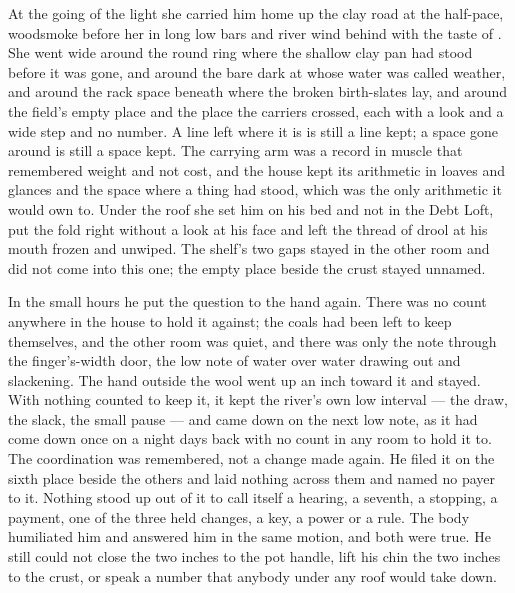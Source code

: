 \scenebreak

At the going of the light she carried him home up the clay road at the half-pace, woodsmoke before her in long low bars and river wind behind with the taste of . She went wide around the round ring where the shallow clay pan had stood before it was gone, and around the bare dark  at  whose water was called weather, and around the rack space beneath  where the broken birth-slates lay, and around the field's empty place and the place the carriers crossed, each with a look and a wide step and no number. A line left where it is is still a line kept; a space gone around is still a space kept. The carrying arm was a record in muscle that remembered weight and not cost, and the house kept its arithmetic in loaves and glances and the space where a thing had stood, which was the only arithmetic it would own to. Under the roof she set him on his bed and not in the Debt Loft, put the fold right without a look at his face and left the thread of drool at his mouth frozen and unwiped. The shelf's two gaps stayed in the other room and did not come into this one; the empty place beside the crust stayed unnamed.

\scenebreak

In the small hours he put the question to the hand again. There was no count anywhere in the house to hold it against; the coals had been left to keep themselves, and the other room was quiet, and there was only the note through the finger's-width door, the low note of water over water drawing out and slackening. The hand outside the wool went up an inch toward it and stayed. With nothing counted to keep it, it kept the river's own low interval --- the draw, the slack, the small pause --- and came down on the next low note, as it had come down once on a night days back with no count in any room to hold it to. The coordination was remembered, not a change made again. He filed it on the sixth place beside the others and laid nothing across them and named no payer to it. Nothing stood up out of it to call itself a hearing, a seventh, a stopping, a payment, one of the three held changes, a key, a power or a rule. The body humiliated him and answered him in the same motion, and both were true. He still could not close the two inches to the pot handle, lift his chin the two inches to the crust, or speak a number that anybody under any roof would take down.

